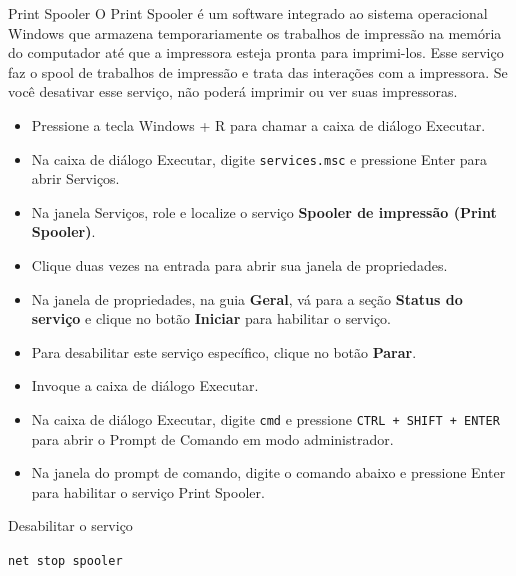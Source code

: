 \documentclass{if-beamer}
\begin{document}
\begin{frame}[allowframebreaks]{Print Spooler}
    O Print Spooler é um software integrado ao sistema operacional Windows que armazena temporariamente os trabalhos de impressão 
    na memória do computador até que a impressora esteja pronta para imprimi-los. Esse serviço faz o spool de trabalhos de impressão
    e trata das interações com a impressora. Se você desativar esse serviço, não poderá imprimir ou ver suas impressoras.

%
%

    \begin{itemize}
        \item Pressione a tecla Windows + R para chamar a caixa de diálogo Executar.
        \item Na caixa de diálogo Executar, digite \texttt{services.msc} e pressione Enter para abrir Serviços.
        \item Na janela Serviços, role e localize o serviço \textbf{Spooler de impressão (Print Spooler)}.
        \item Clique duas vezes na entrada para abrir sua janela de propriedades.
        \item Na janela de propriedades, na guia \textbf{Geral}, vá para a seção \textbf{Status do serviço} e clique no botão \textbf{Iniciar} para habilitar o serviço.
        \item Para desabilitar este serviço específico, clique no botão \textbf{Parar}.
    \end{itemize}

    \framebreak

    \begin{itemize}
        \item Invoque a caixa de diálogo Executar.
        \item Na caixa de diálogo Executar, digite \texttt{cmd} e pressione \texttt{CTRL + SHIFT + ENTER} para abrir o Prompt de Comando em modo administrador.
        \item Na janela do prompt de comando, digite o comando abaixo e pressione Enter para habilitar o serviço Print Spooler.
    \end{itemize}

    \begin{block}{Desabilitar o serviço}
        \begin{center}
            \texttt{net stop spooler}
        \end{center}
    \end{block}
\end{frame}
\end{document}
